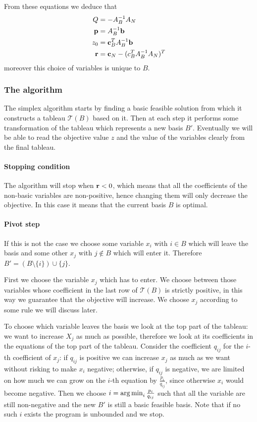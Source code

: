 \documentclass[12pt]{extarticle}
\renewcommand{\vec}[1]{\bvec{#1}}
\begin{document}
From these equations we deduce that
\begin{align}
	Q      & = -A_B^{-1} A_N                     \\
	\vec p & = A_B^{-1} \vec b                   \\
	z_0    & = \vec c_B^T A_B^{-1} \vec b        \\
	\vec r & = \vec c_N - (c^T_B A^{-1}_B A_N)^T
\end{align}
moreover this choice of variables is unique to $B$.

\subsubsection{The algorithm}

The simplex algorithm starts by finding a basic feasible solution from which it constructs a tableau
$\mathcal T(B)$ based on it.
Then at each step it performs some transformation of the tableau which represents a new basis $B'$.
Eventually we will be able to read the objective value $z$ and the value of the variables clearly
from the final tableau.

\paragraph{Stopping condition}
The algorithm will stop when $\vec r < 0$, which means that all the coefficients of the non-basic
variables are non-positive, hence changing them will only decrease the objective.
In this case it means that the current basis $B$ is optimal.

\paragraph{Pivot step}
If this is not the case we choose some variable $x_i$ with $i \in B$ which will leave the basis and
some other $x_j$ with $j \notin B$ which will enter it.
Therefore $B'= (B \setminus \{i\}) \cup \{j\}$.

First we choose the variable $x_j$ which has to enter. We choose between those variables whose
coefficient in the last row of $\mathcal T(B)$ is strictly positive, in this way we guarantee that
the objective will increase.
We choose $x_j$ according to some rule we will discuss later.

To choose which variable leaves the basis we look at the top part of the tableau: we want to increase
$X_j$ as much as possible, therefore we look at its coefficients in the equations of the top part of
the tableau.
Consider the coefficient $q_{ij}$ for the $i$-th coefficient of $x_j$: if $q_{ij}$ is positive we
can increase $x_j$ as much as we want without risking to make $x_i$ negative; otherwise, if $q_{ij}$
is negative, we are limited on how much we can grow on the $i$-th equation by $\frac{p_i}{q_{ij}}$,
since otherwise $x_i$ would become negative.
Then we choose $i = \operatorname*{arg\,min}_{i} \frac{p_i}{q_{ij}}$ such that all the variable are still
non-negative and the new $B'$ is still a basic feasible basis.
Note that if no such $i$ exists the program is unbounded and we stop.
\end{document}

